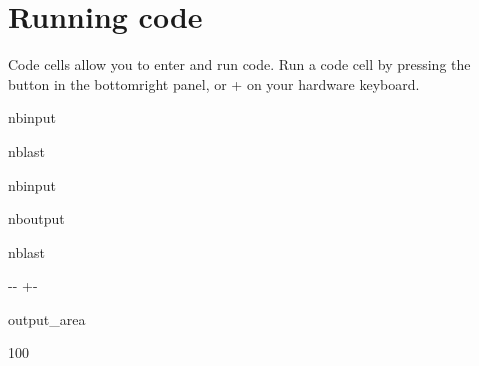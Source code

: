 \documentclass[letterpaper,10pt,english]{sphinxmanual}
\newlength\nbsphinxcodecellspacing
\begin{document}
\section{Running code}
\label{\detokenize{notebooks/Intro/NotebookEditor:Running-code}}
\sphinxAtStartPar
Code cells allow you to enter and run code. Run a code cell by pressing the  button in the bottom\sphinxhyphen{}right panel, or + on your hardware keyboard.

\begin{sphinxuseclass}{nbinput}
\begin{sphinxuseclass}{nblast}
{
\begin{sphinxVerbatim}[commandchars=\\\{\}]
\llap{\color{nbsphinxin}[1]:\,\hspace{\fboxrule}\hspace{\fboxsep}}  
\end{sphinxVerbatim}
}

\end{sphinxuseclass}
\end{sphinxuseclass}
\begin{sphinxuseclass}{nbinput}
{
\begin{sphinxVerbatim}[commandchars=\\\{\}]
\llap{\color{nbsphinxin}[5]:\,\hspace{\fboxrule}\hspace{\fboxsep}}
\end{sphinxVerbatim}
}

\end{sphinxuseclass}
\begin{sphinxuseclass}{nboutput}
\begin{sphinxuseclass}{nblast}
{

\kern-\sphinxverbatimsmallskipamount\kern-\baselineskip
\kern+\FrameHeightAdjust\kern-\fboxrule
\vspace{\nbsphinxcodecellspacing}

\begin{sphinxuseclass}{output_area}
\begin{sphinxuseclass}{}


\begin{sphinxVerbatim}[commandchars=\\\{\}]
100
\end{sphinxVerbatim}



\end{sphinxuseclass}
\end{sphinxuseclass}
}

\end{sphinxuseclass}
\end{sphinxuseclass}
\end{document}
